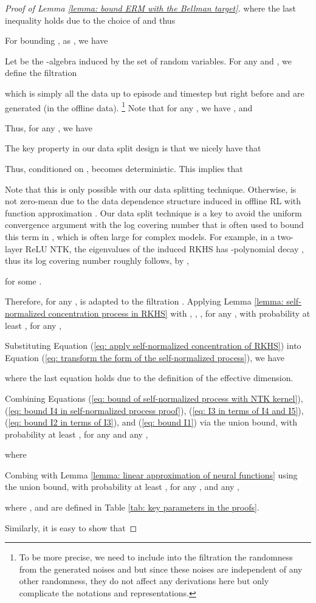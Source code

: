 \documentclass{article} \usepackage{iclr2023/iclr2023_conference,times}
\begin{document}
\begin{proof}[Proof of Lemma \ref{lemma: bound ERM with the Bellman target}]
where the last inequality holds due to the choice of  and thus 




For bounding , as , we have 

Let  be the -algebra induced by the set of random variables. For any  and , we define the filtration 

which is simply all the data up to episode  and timestep  but right before  and  are generated (in the offline data). \footnote{To be more precise, we need to include into the filtration the randomness from the generated noises  and  but since these noises are independent of any other randomness, they do not affect any derivations here but only complicate the notations and representations.} Note that for any , we have , and

Thus, for any , we have 

The key property in our data split design is that we nicely have that

Thus, conditioned on ,  becomes deterministic. This implies that 

Note that this is only possible with our data splitting technique. Otherwise,  is not zero-mean due to the data dependence structure induced in offline RL with function approximation \citep{nguyentang2021sample}. Our data split technique is a key to avoid the uniform convergence argument with the log covering number that is often used to bound this term in \cite{jin2021pessimism}, which is often large for complex models. For example, in a two-layer ReLU NTK, the eigenvalues of the induced RKHS has -polynomial decay \citep{bietti2019inductive}, thus its log covering number roughly follows, by \citep[Lemma~D1]{yang2020function},

for some . 

Therefore, for any ,  is adapted to the filtration . Applying Lemma \ref{lemma: self-normalized concentration process in RKHS} with , , , for any , with probability at least , for any , 


Substituting Equation (\ref{eq: apply self-normalized concentration of RKHS}) into Equation (\ref{eq: transform the form of the self-normalized process}), we have 

where the last equation holds due to the definition of the effective dimension. 



Combining Equations (\ref{eq: bound of self-normalized process with NTK kernel}), (\ref{eq: bound I4 in self-normalized process proof}), (\ref{eq: I3 in terms of I4 and I5}), (\ref{eq: bound I2 in terms of I3}), and (\ref{eq: bound I1}) via the union bound, with probability at least , for any  and any ,

where 

Combing with Lemma \ref{lemma: linear approximation of neural functions} using the union bound, with probability at least , for any , and any ,

where , and  are defined in Table \ref{tab: key parameters in the proofs}.


Similarly, it is easy to show that  


\end{proof} 
\end{document}
